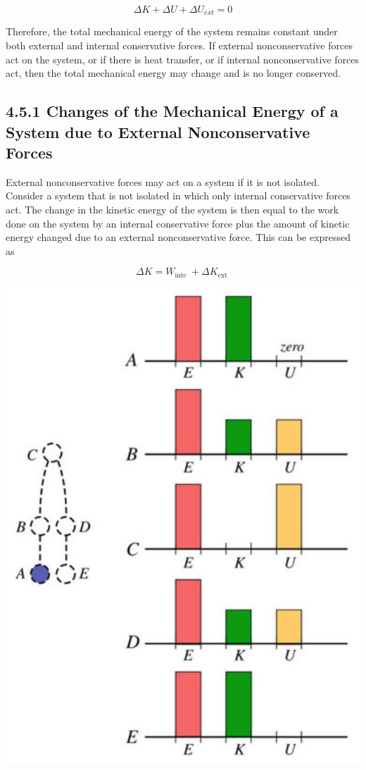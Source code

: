 \documentclass[10pt]{article}
\begin{document}
$$
\Delta K+\Delta U+\Delta U_{e x t}=0
$$

Therefore, the total mechanical energy of the system remains constant under both external and internal conservative forces. If external nonconservative forces act on the system, or if there is heat transfer, or if internal nonconservative forces act, then the total mechanical energy may change and is no longer conserved.

\subsection*{4.5.1 Changes of the Mechanical Energy of a System due to External Nonconservative Forces}
External nonconservative forces may act on a system if it is not isolated. Consider a system that is not isolated in which only internal conservative forces act. The change in the kinetic energy of the system is then equal to the work done on the system by an internal conservative force plus the amount of kinetic energy changed due to an external nonconservative force. This can be expressed as

$$
\Delta K=W_{\text {intc }}+\Delta K_{\text {ext }}
$$

\begin{center}
\includegraphics[max width=\textwidth]{2024_09_13_db1f357d2aad0a03eb2eg-071}
\end{center}
\end{document}
